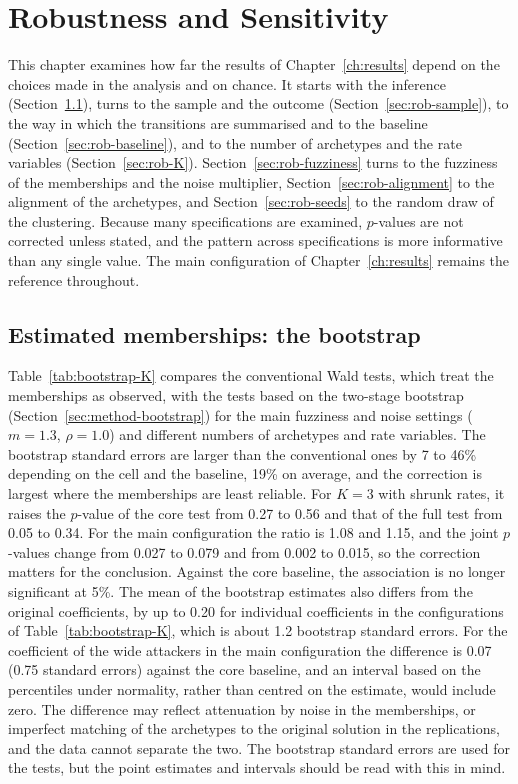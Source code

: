 \chapter{Robustness and Sensitivity}
\label{ch:robustness}

This chapter examines how far the results of Chapter~\ref{ch:results} depend on the choices made in the analysis and on chance. It starts with the inference (Section~\ref{sec:rob-bootstrap}), turns to the sample and the outcome (Section~\ref{sec:rob-sample}), to the way in which the transitions are summarised and to the baseline (Section~\ref{sec:rob-baseline}), and to the number of archetypes and the rate variables (Section~\ref{sec:rob-K}). Section~\ref{sec:rob-fuzziness} turns to the fuzziness of the memberships and the noise multiplier, Section~\ref{sec:rob-alignment} to the alignment of the archetypes, and Section~\ref{sec:rob-seeds} to the random draw of the clustering. Because many specifications are examined, $p$-values are not corrected unless stated, and the pattern across specifications is more informative than any single value. The main configuration of Chapter~\ref{ch:results} remains the reference throughout.

\section{Estimated memberships: the bootstrap}
\label{sec:rob-bootstrap}

Table~\ref{tab:bootstrap-K} compares the conventional Wald tests, which treat the memberships as observed, with the tests based on the two-stage bootstrap (Section~\ref{sec:method-bootstrap}) for the main fuzziness and noise settings ($m=1.3$, $\rho=1.0$) and different numbers of archetypes and rate variables. The bootstrap standard errors are larger than the conventional ones by 7 to 46\% depending on the cell and the baseline, 19\% on average, and the correction is largest where the memberships are least reliable. For $K=3$ with shrunk rates, it raises the $p$-value of the core test from 0.27 to 0.56 and that of the full test from 0.05 to 0.34. For the main configuration the ratio is 1.08 and 1.15, and the joint $p$-values change from 0.027 to 0.079 and from 0.002 to 0.015, so the correction matters for the conclusion. Against the core baseline, the association is no longer significant at 5\%. The mean of the bootstrap estimates also differs from the original coefficients, by up to 0.20 for individual coefficients in the configurations of Table~\ref{tab:bootstrap-K}, which is about 1.2 bootstrap standard errors. For the coefficient of the wide attackers in the main configuration the difference is 0.07 (0.75 standard errors) against the core baseline, and an interval based on the percentiles under normality, rather than centred on the estimate, would include zero. The difference may reflect attenuation by noise in the memberships, or imperfect matching of the archetypes to the original solution in the replications, and the data cannot separate the two. The bootstrap standard errors are used for the tests, but the point estimates and intervals should be read with this in mind.

